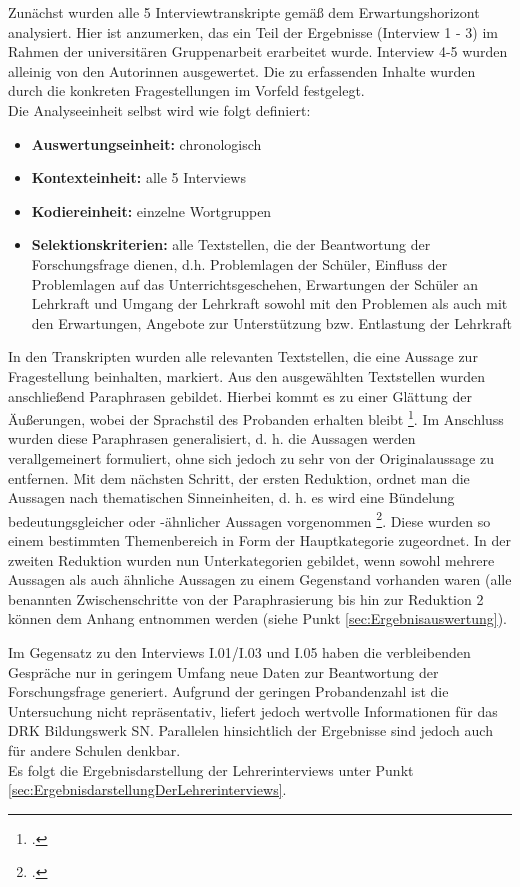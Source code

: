 Zunächst wurden alle 5 Interviewtranskripte gemäß dem Erwartungshorizont analysiert. Hier ist anzumerken, das ein Teil der Ergebnisse (Interview 1 - 3) im Rahmen der universitären Gruppenarbeit erarbeitet wurde. Interview 4-5 wurden alleinig von den Autorinnen ausgewertet. Die zu erfassenden Inhalte wurden durch die konkreten  Fragestellungen im Vorfeld festgelegt.\\

\noindent
Die Analyseeinheit selbst wird wie folgt definiert:

\begin{itemize}
	\item \textbf{Auswertungseinheit:} chronologisch
	\item \textbf{Kontexteinheit:} alle 5 Interviews
	\item \textbf{Kodiereinheit:} einzelne Wortgruppen
	\item \textbf{Selektionskriterien:} alle Textstellen, die der Beantwortung der Forschungsfrage dienen, d.h. Problemlagen der Schüler, Einfluss der Problemlagen auf das Unterrichtsgeschehen, Erwartungen der Schüler an Lehrkraft und Umgang der Lehrkraft sowohl mit den Problemen als auch mit den Erwartungen, Angebote zur Unterstützung bzw. Entlastung der Lehrkraft
\end{itemize}

\noindent
In den Transkripten wurden alle relevanten Textstellen, die eine Aussage zur Fragestellung beinhalten, markiert. Aus den ausgewählten Textstellen wurden anschließend Paraphrasen gebildet. Hierbei kommt es zu einer Glättung der Äußerungen, wobei der Sprachstil des Probanden erhalten bleibt \footcite[vgl.][138]{Krueger2014}. Im Anschluss wurden diese Paraphrasen generalisiert, d. h. die Aussagen werden verallgemeinert formuliert, ohne sich jedoch zu sehr von der Originalaussage zu entfernen. Mit dem nächsten Schritt, der ersten Reduktion, ordnet man die Aussagen nach thematischen Sinneinheiten, d. h. es wird eine Bündelung bedeutungsgleicher oder -ähnlicher Aussagen vorgenommen \footcite[vgl.][139]{Krueger2014}. Diese wurden so einem bestimmten Themenbereich in Form der Hauptkategorie zugeordnet. In der zweiten Reduktion wurden nun Unterkategorien gebildet, wenn sowohl mehrere Aussagen als auch ähnliche Aussagen zu einem Gegenstand vorhanden waren (alle benannten Zwischenschritte von der Paraphrasierung bis hin zur Reduktion 2 können dem Anhang entnommen werden (siehe Punkt \ref{sec:Ergebnisauswertung}).

Im Gegensatz zu den Interviews I.01/I.03 und I.05 haben die verbleibenden Gespräche nur in geringem Umfang neue Daten zur Beantwortung der Forschungsfrage generiert. Aufgrund der geringen Probandenzahl ist die Untersuchung nicht repräsentativ, liefert jedoch wertvolle Informationen für das DRK Bildungswerk SN. Parallelen hinsichtlich der Ergebnisse sind jedoch auch für andere Schulen denkbar.\\

\noindent
Es folgt die Ergebnisdarstellung der Lehrerinterviews unter Punkt \ref{sec:ErgebnisdarstellungDerLehrerinterviews}.